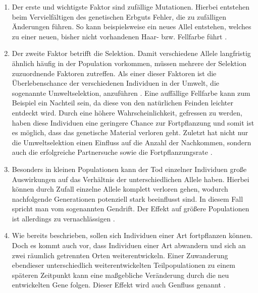 \begin{enumerate}
	\item Der erste und wichtigste Faktor sind zufällige Mutationen. Hierbei entstehen beim Vervielfältigen des genetischen Erbguts Fehler, die zu zufälligen Änderungen führen. So kann beispielsweise ein neues Allel entstehen, welches zu einer neuen, bisher nicht vorhandenen Haar- bzw. Fellfarbe führt \cite{weicker2015evolutionare}. 
	
	\item Der zweite Faktor betrifft die Selektion. Damit verschiedene Allele langfristig ähnlich häufig in der Population vorkommen, müssen mehrere der Selektion zuzuordnende Faktoren zutreffen. Als einer dieser Faktoren ist die Überlebenschance der verschiedenen Individuen in der Umwelt, die sogenannte Umweltselektion, anzuführen \cite{weicker2015evolutionare}. Eine auffällige Fellfarbe kann zum Beispiel ein Nachteil sein, da diese von den natürlichen Feinden leichter entdeckt wird. Durch eine höhere Wahrscheinlichkeit, gefressen zu werden, haben diese Individuen eine geringere Chance zur Fortpflanzung und somit ist es möglich, dass das genetische Material verloren geht. Zuletzt hat nicht nur die Umweltselektion einen Einfluss auf die Anzahl der Nachkommen, sondern auch die erfolgreiche Partnersuche sowie die Fortpflanzungsrate \cite{weicker2015evolutionare}.
	
	\item Besonders in kleinen Populationen kann der Tod einzelner Individuen große Auswirkungen auf das Verhältnis der unterschiedlichen Allele haben. Hierbei können durch Zufall einzelne Allele komplett verloren gehen, wodurch nachfolgende Generationen potenziell stark beeinflusst sind. In diesem Fall spricht man vom sogenannten Gendrift. Der Effekt auf größere Populationen ist allerdings zu vernachlässigen \cite{weicker2015evolutionare}.
	
	\item Wie bereits beschrieben, sollen sich Individuen einer Art fortpflanzen können. Doch es kommt auch vor, dass Individuen einer Art abwandern und sich an zwei räumlich getrennten Orten weiterentwickeln. Einer Zuwanderung ebendieser unterschiedlich weiterentwickelten Teilpopulationen zu einem späteren Zeitpunkt kann eine maßgebliche Veränderung durch die neu entwickelten Gene folgen. Dieser Effekt wird auch Genfluss genannt \cite{weicker2015evolutionare}.
	

\end{enumerate}
